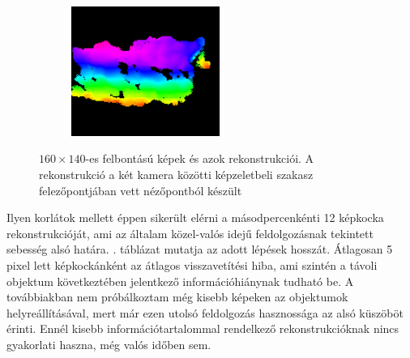 \begin{figure}[tbh]
\begin{subfigure}[b]{\linewidth}
	\includegraphics[width=137pt]{figures/tiny_vis_76.png}
	\caption{}
  \end{subfigure}
\caption{$160\times 140$-es felbontású képek és azok rekonstrukciói. A rekonstrukció a két kamera közötti képzeletbeli szakasz felezőpontjában vett nézőpontból készült \label{fig:cut_160_140}}
\end{figure}

Ilyen korlátok mellett éppen sikerült elérni a másodpercenkénti 12 képkocka rekonstrukcióját, ami az általam közel-valós idejű feldolgozásnak tekintett sebesség alsó határa. . táblázat mutatja az adott lépések hosszát. Átlagosan 5 pixel lett képkockánként az átlagos visszavetítési hiba, ami szintén a távoli objektum következtében jelentkező információhiánynak tudható be. A továbbiakban nem próbálkoztam még kisebb képeken az objektumok helyreállításával, mert már ezen utolsó feldolgozás hasznossága az alsó küszöböt érinti. Ennél kisebb információtartalommal rendelkező rekonstrukcióknak nincs gyakorlati haszna, még valós időben sem.

